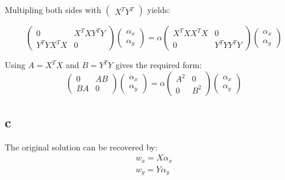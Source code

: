 Multipling both sides with $ \begin{pmatrix}
X^T Y^T \end{pmatrix} $ yields:

\begin{equation}
    \begin{pmatrix}
        0 & X^T X Y^T Y \\
        Y^T Y X^T X & 0
    \end{pmatrix}
    \begin{pmatrix}
        \alpha_x \\ \alpha_y
    \end{pmatrix}
    = \alpha \begin{pmatrix}
        X^T X X^T X & 0 \\
        0 & Y^T Y Y^T Y
    \end{pmatrix}
    \begin{pmatrix}
        \alpha_x \\ \alpha_y
    \end{pmatrix}
\end{equation}

Using $A = X^T X $ and $B = Y^T Y$ gives the required form:
\begin{equation}
    \begin{pmatrix}
        0 & A B \\
        B A & 0
    \end{pmatrix}
    \begin{pmatrix}
        \alpha_x \\ \alpha_y
    \end{pmatrix}
    = \alpha \begin{pmatrix}
        A^2 & 0 \\
        0 & B^2
    \end{pmatrix}
    \begin{pmatrix}
        \alpha_x \\ \alpha_y
    \end{pmatrix}
\end{equation}


\subsection*{c}

The original solution can be recovered by:
\begin{align}
    w_x = X \alpha_x  \\
    w_y = Y \alpha_y
\end{align}
